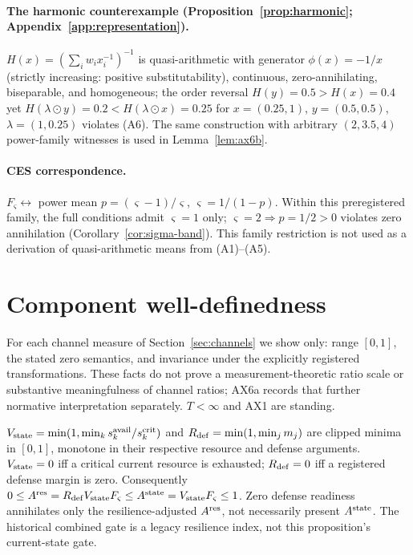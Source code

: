 \paragraph{The harmonic counterexample (Proposition~\ref{prop:harmonic}; Appendix~\ref{app:representation}).}
$H(x)=(\sum_iw_ix_i^{-1})^{-1}$ is quasi-arithmetic with generator
$\phi(x)=-1/x$ (strictly increasing: positive substitutability), continuous,
zero-annihilating, biseparable, and homogeneous; the order reversal
$H(y)=0.5>H(x)=0.4$ yet $H(\lambda\odot y)=0.2<H(\lambda\odot x)=0.25$ for
$x=(0.25,1)$, $y=(0.5,0.5)$, $\lambda=(1,0.25)$ violates (A6). The same
construction with arbitrary $(2,3.5,4)$ power-family witnesses is used in
Lemma~\ref{lem:ax6b}.

\paragraph{CES correspondence.} $F_\varsigma\leftrightarrow$ power mean
$p=(\varsigma-1)/\varsigma$, $\varsigma=1/(1-p)$. Within this preregistered
family, the full conditions admit $\varsigma=1$ only; $\varsigma=2\Rightarrow
p=1/2>0$ violates zero annihilation (Corollary~\ref{cor:sigma-band}). This
family restriction is not used as a derivation of quasi-arithmetic means
from (A1)--(A5).

\section{Component well-definedness}\label{app:components}

For each channel measure of Section~\ref{sec:channels} we show only:
range $[0,1]$, the stated zero semantics, and invariance under the explicitly
registered transformations. These facts do not prove a measurement-theoretic
ratio scale or substantive meaningfulness of channel ratios; AX6a records
that further normative interpretation separately. $T<\infty$ and AX1 are
standing.

\begin{proposition}[$\Avia$, $\Rdef$, $\Astate$]\label{prop:wd-via}
$V_{\mathrm{state}}=\min(1,\min_k s_k^{\mathrm{avail}}/s_k^{\mathrm{crit}})$ and
$R_{\mathrm{def}}=\min(1,\min_jm_j)$ are clipped minima in $[0,1]$, monotone in their
respective resource and defense arguments. $V_{\mathrm{state}}=0$ iff a critical current
resource is exhausted; $R_{\mathrm{def}}=0$ iff a registered defense margin is zero.
Consequently $0\le A^{\mathrm{res}}=R_{\mathrm{def}}V_{\mathrm{state}} F_\varsigma\le A^{\mathrm{state}}=V_{\mathrm{state}} F_\varsigma
\le1$. Zero defense readiness annihilates only the resilience-adjusted
$A^{\mathrm{res}}$, not necessarily present $\Astate$. The historical combined gate is a
legacy resilience index, not this proposition's current-state gate.
\end{proposition}

